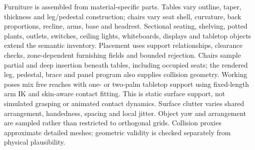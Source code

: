 \documentclass{article}
\begin{document}
Furniture is assembled from material-specific parts. Tables vary outline, taper, thickness and leg/pedestal construction; chairs vary seat shell, curvature, back proportions, recline, arms, base and headrest. Sectional seating, shelving, potted plants, outlets, switches, ceiling lights, whiteboards, displays and tabletop objects extend the semantic inventory. Placement uses support relationships, clearance checks, zone-dependent furnishing fields and bounded rejection. Chairs sample partial and deep insertion beneath tables, including occupied seats; the rendered leg, pedestal, brace and panel program also supplies collision geometry. Working poses mix free reaches with one- or two-palm tabletop support using fixed-length arm IK and skin-aware contact fitting. This is static surface support, not simulated grasping or animated contact dynamics. Surface clutter varies shared arrangement, handedness, spacing and local jitter. Object yaw and arrangement are sampled rather than restricted to orthogonal grids. Collision proxies approximate detailed meshes; geometric validity is checked separately from physical plausibility.
\end{document}
